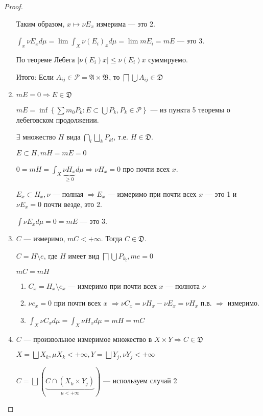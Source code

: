 \begin{proof}
\begin{enumerate}
              Таким образом, \(x \mapsto \nu E_x\) измерима --- это 2.

              \(\int_x \nu E_x d\mu = \lim \int_X \nu(E_i)_x d\mu = \lim m E_i = m E\) --- это 3.

              По теореме Лебега %
              \(|\nu(E_i) x| \leq \nu(E_i)x\) суммируемо.

              Итого: Если \(A_{ij}\in \mathcal{P}  = \mathfrak{A} \times \mathfrak{B}\), то \(\bigsqcap \bigcup A_{ij} \in \mathfrak{D}\)

        \item \(m E = 0 \Rightarrow E \in \mathfrak{D}\)

              \(m E = \inf \left\{\sum m_0 P_k : E \subset \bigcup P_k, P_k \in \mathcal{P}\right\} \) --- из пункта 5 теоремы о лебеговском продолжении.

              \(\exists \) множество \(H\) вида \(\bigcap_l \bigsqcup_k P_{kl}\), т.е. \(H\in \mathfrak{D}\).

              \(E\subset H, m H = m E = 0\)

              \(0 = mH = \int_X \underbrace{\nu H_x}_{ \geq 0} d\mu \Rightarrow \nu H_x = 0\) про почти всех \(x\).

              \(E_x \subset H_x, \nu\) --- полная \( \Rightarrow E_x\) --- измеримо при почти всех \(x\) --- это 1 и \(\nu E_x = 0\) почти везде, это 2.

              \(\int \nu E_x d\mu = 0 = m E\) --- это 3.

        \item \(C\) --- измеримо, \(mC < +\infty\). Тогда \(C\in \mathfrak{D}\).

              \(C = H \setminus e\), где \(H\) имеет вид \(\bigsqcap \bigcup P_{k_l}, me = 0\)

              \(mC = mH\)

              \begin{enumerate}
                  \item \(C_x = H_x \setminus e_x\) --- измеримо при почти всех \(x\) --- полнота \(\nu\)
                  \item \(\nu e_x = 0\) при почти всех \(x\) \( \Rightarrow \nu C_x = \nu H_x - \nu E_x = \nu H_x\) п.в. \(\Rightarrow \) измеримо.
                  \item \(\int_X \nu C_x d\mu = \int_X \nu H_x d\mu = mH = mC\)
              \end{enumerate}

        \item \(C\) --- произвольное измеримое множество в \(X \times Y \Rightarrow C \in \mathfrak{D}\)

              \(X = \bigsqcup X_k, \mu X_k < +\infty, Y = \bigsqcup Y_j, \nu Y_j < +\infty\)

              \(C = \bigsqcup (\underbrace{C \cap (X_k \times Y_j)}_{\mu < +\infty})\) --- используем случай 2
    \end{enumerate}
\end{proof}

